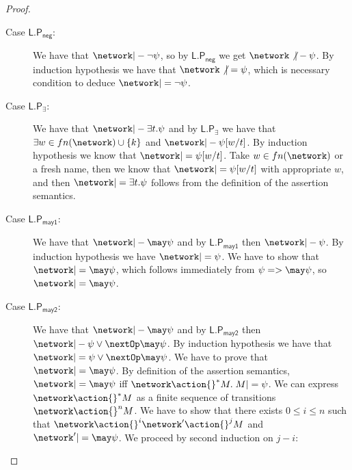\begin{proof}
\begin{description}
    \item[Case $\mathsf{L.P_{neg}}$:] We have that $\network |- \lnot
      \psi$, so by $\mathsf{L.P_{neg}}$ we get $\network \not |-
      \psi$. By induction hypothesis we have that $\network \not
      |= \psi$, which is necessary condition to deduce
      $\network |= \lnot \psi$.


  \item[Case $\mathsf{L.P_{\exists}}$:] We have that $\network |-
    \exists t. \psi$ and by $\mathsf{L.P_{\exists}}$ we have that
    $\exists w \in fn(\network) \cup \{ k \}$ and  $\network |-
    \psi [w/t]$. By induction hypothesis we know that $\network |=
    \psi [w/t]$. Take $w \in fn(\network)$ or a fresh name, then we know
    that $\network |= \psi[w/t]$ with appropriate $w$, and then
    $\network |= \exists t. \psi$ follows from the definition of
    the assertion semantics. 





  \item[Case $\mathsf{L.P_{may1}}$:] We have that $\network |- \may
    \psi$ and by $\mathsf{L.P_{may1}}$ then $\network |- \psi$. By
    induction hypothesis we have $\network |= \psi$. We have to
    show that $\network |= \may \psi$, which follows immediately
    from $\psi => \may \psi$, so $\network |= \may \psi$.

  \item[Case $\mathsf{L.P_{may2}}$:] We have that $\network |- \may
    \psi$ and by $\mathsf{L.P_{may2}}$ then $\network |- \psi \lor \nextOp
    \may \psi$. By induction hypothesis we have that $\network |=
    \psi \lor \nextOp \may \psi$. We have to prove that $\network |= \may
    \psi$. By definition of the assertion semantics, $\network |=
    \may \psi$ iff $\network \action{ }^* M. \; M |= \psi $. We can
    express $ \network \action{ }^*  M $ as a finite sequence of
    transitions $\network \action{ }^n M$. We
    have to show that there exists $0 \leq i \leq n$ such that
    $\network \action{}^i \network' \action{}^j
    M$ and $\network' |= \may \psi$. We
    proceed by second induction on $j-i$:
    

\end{description}
\end{proof}
